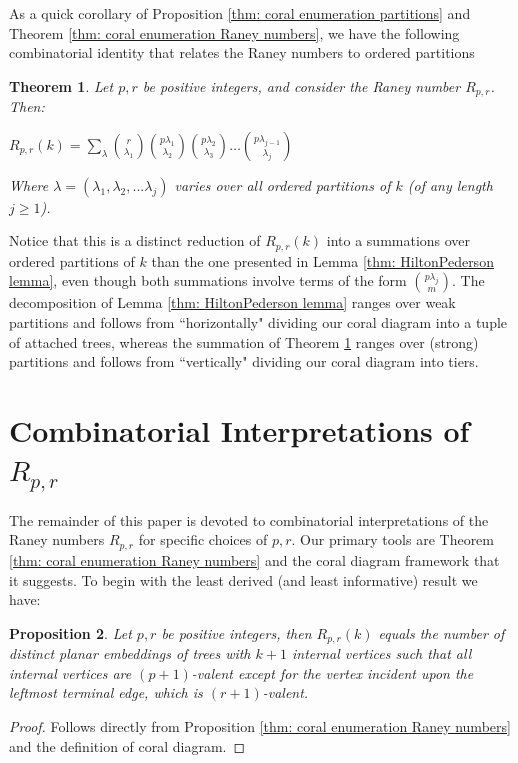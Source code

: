\documentclass[documentfleqn,12pt]{amsart}
\newtheorem{theorem}{Theorem}[section]
\newtheorem{proposition}[theorem]{Proposition}
\begin{document}
As a quick corollary of Proposition \ref{thm: coral enumeration partitions} and Theorem \ref{thm: coral enumeration Raney numbers}, we have the following combinatorial identity that relates the Raney numbers to ordered partitions

\begin{theorem}
\label{thm: Raney numbers and ordered partitions}
Let $p,r$ be positive integers, and consider the Raney number $R_{p,r}$.  Then:

\begin{center}
$\displaystyle{R_{p,r}(k) = \sum_\lambda \binom{r}{\lambda_1} \binom{p \lambda_1}{\lambda_2} \binom{p \lambda_2}{\lambda_3} \hdots \binom{p \lambda_{j-1}}{\lambda_j}}$
\end{center}
\noindent Where $\lambda = (\lambda_1,\lambda_2,...\lambda_j)$ varies over all ordered partitions of $k$ (of any length $j \geq 1$).
\end{theorem}

Notice that this is a distinct reduction of $R_{p,r}(k)$ into a summations over ordered partitions of $k$ than the one presented in Lemma \ref{thm: HiltonPederson lemma}, even though both summations involve terms of the form $\binom{p\lambda_j}{m}$.  The decomposition of Lemma \ref{thm: HiltonPederson lemma} ranges over weak partitions and follows from ``horizontally" dividing our coral diagram into a tuple of attached trees, whereas the summation of Theorem \ref{thm: Raney numbers and ordered partitions} ranges over (strong) partitions and follows from ``vertically" dividing our coral diagram into tiers. 

\section{Combinatorial Interpretations of $R_{p,r}$}
\label{sec: interpretations}

The remainder of this paper is devoted to combinatorial interpretations of the Raney numbers $R_{p,r}$ for specific choices of $p,r$.  Our primary tools are Theorem \ref{thm: coral enumeration Raney numbers} and the coral diagram framework that it suggests.  To begin with the least derived (and least informative) result we have:

\begin{proposition}
\label{thm: raney interpretation general p r}
Let $p,r$ be positive integers, then $R_{p,r}(k)$ equals the number of distinct planar embeddings of trees with $k+1$ internal vertices such that all internal vertices are $(p+1)$-valent except for the vertex incident upon the leftmost terminal edge, which is $(r+1)$-valent.
\end{proposition}
\begin{proof}
Follows directly from Proposition \ref{thm: coral enumeration Raney numbers} and the definition of coral diagram.
\end{proof}
\end{document}
